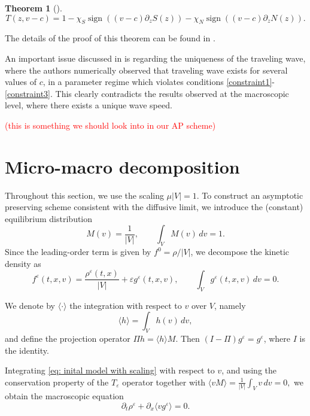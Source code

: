 \documentclass[11pt,twoside]{article}
\numberwithin{equation}{section}
\DeclareMathOperator{\sign}{sign}
\theoremstyle{plain}
\newtheorem{theorem}{Theorem}[section]
\theoremstyle{nonumberplain}
\begin{document}
{\begin{theorem}[\cite{calvez2019chemotactic}]
\[
    T(z, v-c) = 1 - \chi_S \sign((v-c)\partial_zS(z)) - \chi_N \sign((v-c)\partial_zN(z)) .
\]

\end{theorem}
The details of the proof of this theorem can be found in \cite{calvez2019chemotactic}.

\noindent An important issue discussed in \cite{calvez2018well} is regarding the uniqueness of the traveling wave, where the authors numerically observed that traveling wave exists for several values of $c$, in a parameter regime which violates conditions \eqref{constraint1}-\eqref{constraint3}. This clearly contradicts the results observed at the macroscopic level, where there exists a unique wave speed.  

\textcolor{red}{(this is something we should look into in our AP scheme)}
\fi

{
\section{Micro-macro decomposition}
\label{sec: micro macro decomp}

Throughout this section, we use the scaling $\mu |V|=1$. 
To construct an asymptotic preserving scheme consistent with the diffusive limit, we introduce the (constant) equilibrium distribution 
\[
M(v)=\frac1{|V|},
\qquad \int_V M(v)\,dv=1.
\]
Since the leading-order term is given by \(f^0=\rho/|V|\), we decompose the kinetic density as
\begin{equation}\label{f_expansion}
f^\varepsilon(t,x,v)=\frac{\rho^\varepsilon(t,x)}{|V|}+\varepsilon g^\varepsilon(t,x,v),
\qquad
\int_V g^\varepsilon(t,x,v)\,dv=0.
\end{equation}


We denote by \(\langle \cdot \rangle\) the integration with respect to \(v\) over \(V\), namely
\[
\langle h\rangle = \int_V h(v)\,dv,
\]
and define the projection operator
$
\Pi h = \langle h\rangle M.
$ Then \((I-\Pi)g^\varepsilon=g^\varepsilon\), where $I$ is the identity.

Integrating \eqref{eq: inital model with scaling} with respect to \(v\), and using the conservation property of the $T_\varepsilon$ operator together with
$
\langle vM\rangle = \frac1{|V|}\int_V v\,dv = 0,
$
we obtain the macroscopic equation
\[
\partial_t \rho^\varepsilon + \partial_x \langle v g^\varepsilon\rangle = 0.
\]


}}
\end{document}
